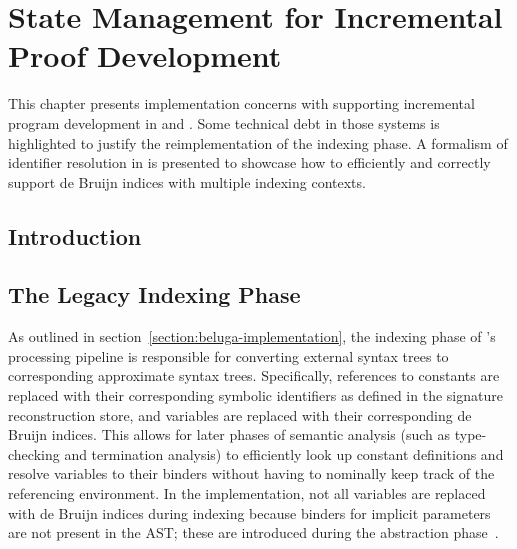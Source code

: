 \chapter{State Management for Incremental Proof Development}

This chapter presents implementation concerns with supporting incremental program development in \Beluga and \Harpoon.
Some technical debt in those systems is highlighted to justify the reimplementation of the indexing phase.
A formalism of identifier resolution in \Beluga is presented to showcase how to efficiently and correctly support de Bruijn indices with multiple indexing contexts.

\section{Introduction}




\section{The Legacy Indexing Phase}


As outlined in section~\ref{section:beluga-implementation}, the indexing phase of \Beluga's processing pipeline is responsible for converting external syntax trees to corresponding approximate syntax trees.
Specifically, references to constants are replaced with their corresponding symbolic identifiers as defined in the signature reconstruction store, and variables are replaced with their corresponding de Bruijn indices.
This allows for later phases of semantic analysis (such as type-checking and termination analysis) to efficiently look up constant definitions and resolve variables to their binders without having to nominally keep track of the referencing environment.
In the implementation, not all variables are replaced with de Bruijn indices during indexing because binders for implicit parameters are not present in the \ac{AST}; these are introduced during the abstraction phase~\cite{germain2010implementation}.

